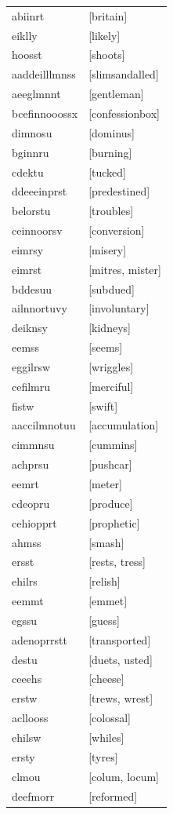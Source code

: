 \documentclass{article}
\begin{document}
\begin{tabular}{ll}
abiinrt & [britain] \\
eiklly & [likely] \\
hoosst & [shoots] \\
aaddeilllmnss & [slimsandalled] \\
aeeglmnnt & [gentleman] \\
bcefinnooossx & [confessionbox] \\
dimnosu & [dominus] \\
bginnru & [burning] \\
cdektu & [tucked] \\
ddeeeinprst & [predestined] \\
belorstu & [troubles] \\
ceinnoorsv & [conversion] \\
eimrsy & [misery] \\
eimrst & [mitres, mister] \\
bddesuu & [subdued] \\
ailnnortuvy & [involuntary] \\
deiknsy & [kidneys] \\
eemss & [seems] \\
eggilrsw & [wriggles] \\
cefilmru & [merciful] \\
fistw & [swift] \\
aaccilmnotuu & [accumulation] \\
cimmnsu & [cummins] \\
achprsu & [pushcar] \\
eemrt & [meter] \\
cdeopru & [produce] \\
cehiopprt & [prophetic] \\
ahmss & [smash] \\
ersst & [rests, tress] \\
ehilrs & [relish] \\
eemmt & [emmet] \\
egssu & [guess] \\
adenoprrstt & [transported] \\
destu & [duets, usted] \\
ceeehs & [cheese] \\
erstw & [trews, wrest] \\
acllooss & [colossal] \\
ehilsw & [whiles] \\
ersty & [tyres] \\
clmou & [colum, locum] \\
deefmorr & [reformed] \\

\end{tabular}
\end{document}
